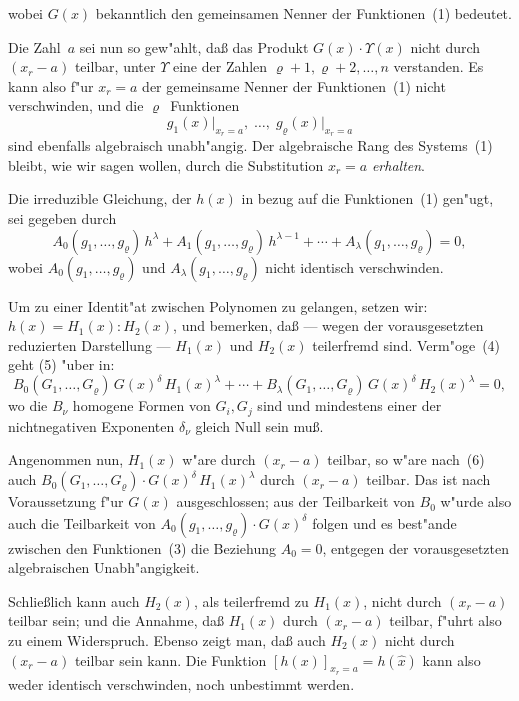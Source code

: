\documentclass[11pt,a4paper]{article}
\begin{document}
wobei $G(x)$ bekanntlich den gemeinsamen Nenner der Funktionen~(1)
bedeutet.

Die Zahl~$a$ sei nun so gew"{a}hlt, da\ss{} das Produkt $G(x)\cdot\Upsilon(x)$ nicht
durch $(x_{r}-a)$ teilbar, unter $\Upsilon$ eine der Zahlen $\varrho+1,\varrho+2,\dots,n$
verstanden. Es kann also f"{u}r $x_{r}=a$ der gemeinsame Nenner der
Funktionen~(1) nicht verschwinden, und die $\varrho$~Funktionen
\begin{equation}
g_{1}(x)\big|_{x_{r}=a},\;\dots,\;g_{\varrho}(x)\big|_{x_{r}=a}
\tag{3}
\end{equation}
sind ebenfalls algebraisch unabh"{a}ngig. Der algebraische Rang des Systems~(1)
bleibt, wie wir sagen wollen, durch die Substitution $x_{r}=a$ \emph{erhalten}.

Die irreduzible Gleichung, der $h(x)$ in bezug auf die Funktionen~(1)
gen"{u}gt, sei gegeben durch
\begin{equation}
A_{0}(g_{1},\dots,g_{\varrho})\,h^{\lambda}+A_{1}(g_{1},\dots,g_{\varrho})\,h^{\lambda-1}+\cdots+A_{\lambda}(g_{1},\dots,g_{\varrho})=0,
\tag{4}
\end{equation}
wobei $A_{0}(g_{1},\dots,g_{\varrho})$ und $A_{\lambda}(g_{1},\dots,g_{\varrho})$ nicht identisch verschwinden.

Um zu einer Identit"{a}t zwischen Polynomen zu gelangen, setzen wir:
$h(x)=H_{1}(x):H_{2}(x)$, und bemerken, da\ss{} --- wegen der vorausgesetzten
reduzierten Darstellung --- $H_{1}(x)$ und $H_{2}(x)$ teilerfremd sind. Verm"{o}ge~(4)
geht (5) "{u}ber in:
\begin{equation}
B_{0}(G_{1},\dots,G_{\varrho})\,G(x)^{\delta}\,H_{1}(x)^{\lambda}+\cdots+
B_{\lambda}(G_{1},\dots,G_{\varrho})\,G(x)^{\delta}\,H_{2}(x)^{\lambda}=0,
\tag{6}
\end{equation}
wo die $B_{\nu}$ homogene Formen von $G_{i},G_{j}$ sind und mindestens einer der
nichtnegativen Exponenten $\delta_{\nu}$ gleich Null sein mu\ss{}.

Angenommen nun, $H_{1}(x)$ w"{a}re durch $(x_{r}-a)$ teilbar, so w"{a}re nach~(6)
auch $B_{0}(G_{1},\dots,G_{\varrho})\cdot G(x)^{\delta}\,H_{1}(x)^{\lambda}$ durch $(x_{r}-a)$ teilbar.
Das ist nach Voraussetzung f"{u}r $G(x)$ ausgeschlossen; aus der Teilbarkeit
von $B_{0}$ w"{u}rde also auch die Teilbarkeit von
$A_{0}(g_{1},\dots,g_{\varrho})\cdot G(x)^{\delta}$ folgen und es best"{a}nde zwischen den Funktionen~(3)
die Beziehung $A_{0}=0$, entgegen der vorausgesetzten algebraischen Unabh"{a}ngigkeit.

Schlie\ss{}lich kann auch $H_{2}(x)$, als teilerfremd zu $H_{1}(x)$, nicht durch
$(x_{r}-a)$ teilbar sein; und die Annahme, da\ss{} $H_{1}(x)$ durch $(x_{r}-a)$ teilbar,
f"{u}hrt also zu einem Widerspruch. Ebenso zeigt man, da\ss{} auch $H_{2}(x)$
nicht durch $(x_{r}-a)$ teilbar sein kann. Die Funktion $[h(x)]_{x_{r}=a}=h(\hat{x})$
kann also weder identisch verschwinden, noch unbestimmt werden.
\end{document}
